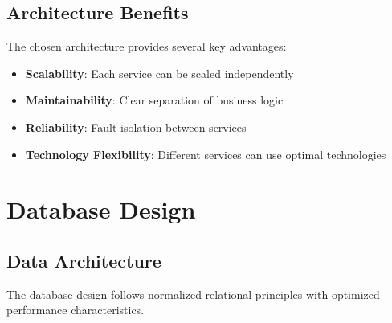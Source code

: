 \documentclass[11pt,a4paper,oneside]{article}
\begin{document}
\subsection{Architecture Benefits}

The chosen architecture provides several key advantages:

\begin{itemize}
\item \textbf{Scalability}: Each service can be scaled independently
\item \textbf{Maintainability}: Clear separation of business logic
\item \textbf{Reliability}: Fault isolation between services
\item \textbf{Technology Flexibility}: Different services can use optimal technologies
\end{itemize}

\section{Database Design}

\subsection{Data Architecture}

The database design follows normalized relational principles with optimized performance characteristics.
\end{document}
